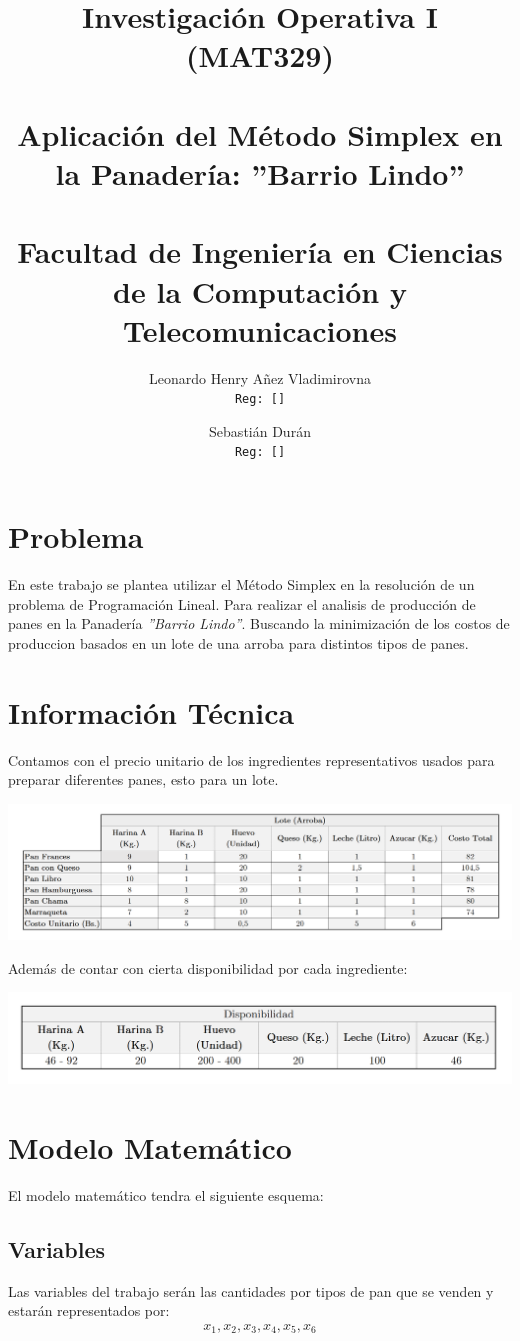 \documentclass[10pt,letterpaper]{book}
\author{
Leonardo Henry Añez Vladimirovna\\
\texttt{Reg: [\hspace{3cm}]}
\and
Sebastián Durán\\
\texttt{Reg: [\hspace{3cm}]}
}
\title{
Investigación Operativa I (MAT329)\\ ${ }$\\
\textbf{Aplicación del Método Simplex en la Panadería: ''Barrio Lindo''}
\\ ${ }$\\
\small Facultad de Ingeniería en Ciencias de la Computación y Telecomunicaciones\\}
\begin{document}
\maketitle
\section*{Problema}
En este trabajo se plantea utilizar el Método Simplex en la resolución de un problema de Programación Lineal. Para realizar el analisis de producción de panes en la Panadería \textit{''Barrio Lindo''}. Buscando la minimización de los costos de produccion basados en un lote de una arroba para distintos tipos de panes.
\section*{Información Técnica}
Contamos con el precio unitario de los ingredientes representativos usados para preparar diferentes panes, esto para un lote.
\begin{center}
\includegraphics[scale=0.66]{Tabla}
\end{center}
Además de contar con cierta disponibilidad por cada ingrediente:
\begin{center}
\includegraphics[scale=0.66]{Tabla2}
\end{center}
\section*{Modelo Matemático}
El modelo matemático tendra el siguiente esquema:
\subsection*{Variables}
Las variables del trabajo serán las cantidades por tipos de pan que se venden y estarán representados por:
\begin{align*}
x_1,x_2,x_3,x_4,x_5,x_6
\end{align*}
\end{document}
